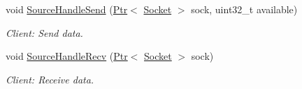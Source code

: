 \begin{DoxyCompactItemize}
void \hyperlink{classTcpTestCase_ae2b2672883a732447f02e4bf82840f34}{Source\+Handle\+Send} (\hyperlink{classns3_1_1Ptr}{Ptr}$<$ \hyperlink{classns3_1_1Socket}{Socket} $>$ sock, uint32\+\_\+t available)
\begin{DoxyCompactList}\small\item\em Client\+: Send data. \end{DoxyCompactList}\item 
void \hyperlink{classTcpTestCase_a924eda25940bdd641e431408eb750a24}{Source\+Handle\+Recv} (\hyperlink{classns3_1_1Ptr}{Ptr}$<$ \hyperlink{classns3_1_1Socket}{Socket} $>$ sock)
\begin{DoxyCompactList}\small\item\em Client\+: Receive data. \end{DoxyCompactList}\end{DoxyCompactItemize}
